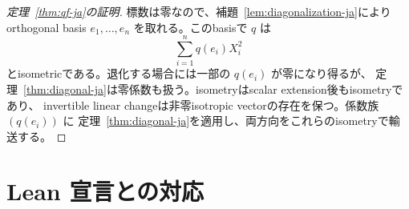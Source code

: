 \documentclass[uplatex,dvipdfmx]{jsarticle}
\theoremstyle{definition}
\theoremstyle{remark}
\begin{document}
\begin{proof}[定理~\ref{thm:qf-ja}の証明]
標数は零なので、補題~\ref{lem:diagonalization-ja}によりorthogonal basis
$e_1,\ldots,e_n$ を取れる。このbasisで $q$ は
\[
  \sum_{i=1}^n q(e_i)X_i^2
\]
とisometricである。退化する場合には一部の $q(e_i)$ が零になり得るが、
定理~\ref{thm:diagonal-ja}は零係数も扱う。isometryはscalar extension後もisometryであり、
invertible linear changeは非零isotropic vectorの存在を保つ。係数族 $(q(e_i))$ に
定理~\ref{thm:diagonal-ja}を適用し、両方向をこれらのisometryで輸送する。
\end{proof}

\section{Lean 宣言との対応}
\end{document}
